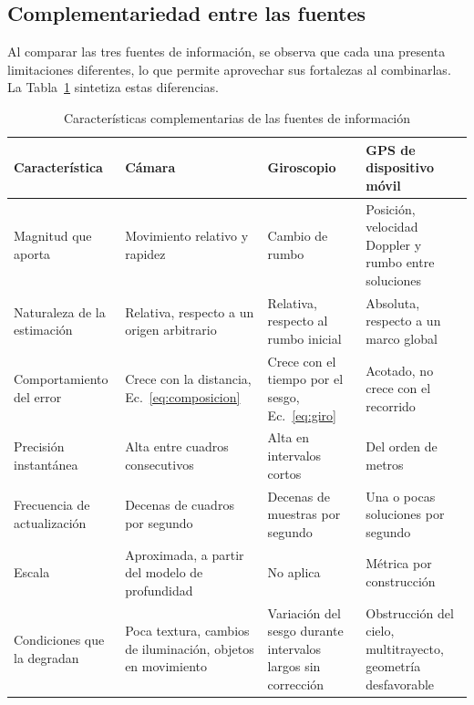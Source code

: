 \subsection{Complementariedad entre las fuentes}

Al comparar las tres fuentes de información, se observa que cada una presenta limitaciones diferentes, lo que permite aprovechar sus fortalezas al combinarlas.
La Tabla~\ref{tab:complementariedad} sintetiza estas diferencias.

\begin{table}[H]
\centering
\caption{Características complementarias de las fuentes de información}
\label{tab:complementariedad}
\small
\begin{tabularx}{\textwidth}{@{}>{\raggedright\arraybackslash}p{2.95cm}>{\raggedright\arraybackslash}X>{\raggedright\arraybackslash}X>{\raggedright\arraybackslash}X@{}}
\toprule
\textbf{Característica} & \textbf{Cámara} & \textbf{Giroscopio} & \textbf{GPS de dispositivo móvil} \\
\midrule
Magnitud que aporta & Movimiento relativo y rapidez & Cambio de rumbo & Posición, velocidad Doppler y rumbo entre soluciones \\
\addlinespace
Naturaleza de la estimación & Relativa, respecto a un origen arbitrario & Relativa, respecto al rumbo inicial & Absoluta, respecto a un marco global \\
\addlinespace
Comportamiento del error & Crece con la distancia, Ec.~\eqref{eq:composicion} & Crece con el tiempo por el sesgo, Ec.~\eqref{eq:giro} & Acotado, no crece con el recorrido \\
\addlinespace
Precisión instantánea & Alta entre cuadros consecutivos & Alta en intervalos cortos & Del orden de metros \\
\addlinespace
Frecuencia de actualización & Decenas de cuadros por segundo & Decenas de muestras por segundo & Una o pocas soluciones por segundo \\
\addlinespace
Escala & Aproximada, a partir del modelo de profundidad & No aplica & Métrica por construcción \\
\addlinespace
Condiciones que la degradan & Poca textura, cambios de iluminación, objetos en movimiento & Variación del sesgo durante intervalos largos sin corrección & Obstrucción del cielo, multitrayecto, geometría desfavorable \\
\bottomrule
\end{tabularx}
\end{table}

